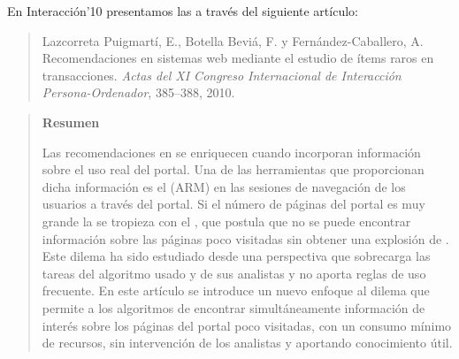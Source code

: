 En Interacción'10 presentamos las \ROPs a través del siguiente artículo:
\begin{quote}
  Lazcorreta Puigmartí, E., Botella Beviá, F. y Fernández-Caballero, A. Recomendaciones en sistemas web mediante el estudio de ítems raros en transacciones. {\em Actas del XI Congreso Internacional de Interacción Persona-Ordenador}, 385--388, 2010. 
\end{quote}

	\begin{quotation}
	\noindent\textbf{Resumen}

	\nopagebreak Las recomendaciones en \portalesWeb se enriquecen cuando incorporan información sobre el uso real del portal. Una de las herramientas que proporcionan dicha información es el \ARM (ARM) en las sesiones de navegación de los usuarios a través del portal. Si el número de páginas del portal es muy grande la \ARM se tropieza con el \dilemaIR, que postula que no se puede encontrar información sobre las páginas poco visitadas sin obtener una explosión de \ars. Este dilema ha sido estudiado desde una perspectiva que sobrecarga las tareas del algoritmo usado y de sus analistas y no aporta reglas de uso frecuente. En este artículo se introduce un nuevo enfoque al dilema que permite a los algoritmos de \ARM encontrar simultáneamente información de interés sobre los páginas del portal poco visitadas, con un consumo mínimo de recursos, sin intervención de los analistas y aportando conocimiento útil.
	\end{quotation}


